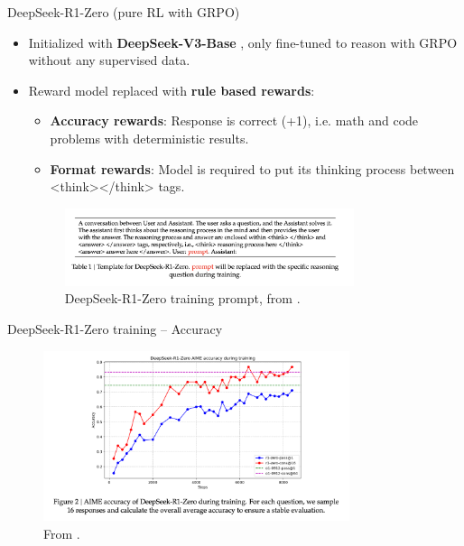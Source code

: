 \documentclass[9pt]{beamer}
\begin{document}
\begin{frame}{DeepSeek-R1-Zero (pure RL with GRPO)}
\begin{itemize}\setlength\itemsep{0.35em}
  \item Initialized with \textbf{DeepSeek-V3-Base} \cite{deepseekai2025deepseekv3technicalreport}, only fine-tuned to reason with GRPO without any supervised data.
  \pause
  \vfill
  \item Reward model replaced with \textbf{rule based rewards}:
  \begin{itemize}
      \item \textbf{Accuracy rewards}: Response is correct (+1), i.e. math and code problems with deterministic results.
      \item \textbf{Format rewards}: Model is required to put its thinking process between <think></think> tags.
  \end{itemize}
  \vfill
  \begin{figure}
    \centering
    \includegraphics[width=0.8\textwidth]{figures/r1-zero-prompt.png}
    \caption{DeepSeek-R1-Zero training prompt, from \cite{deepseekai2025deepseekr1incentivizingreasoningcapability}.}
    \label{fig:trl6}
  \end{figure}
\end{itemize}
\end{frame}

\begin{frame}{DeepSeek-R1-Zero training -- Accuracy}

  \begin{figure}
    \centering
    \includegraphics[width=0.8\textwidth]{figures/r1_zero_training.png}
    \caption{From \cite{deepseekai2025deepseekr1incentivizingreasoningcapability}.}
    \label{fig:trl7}
  \end{figure}
  
\end{frame}
\end{document}
